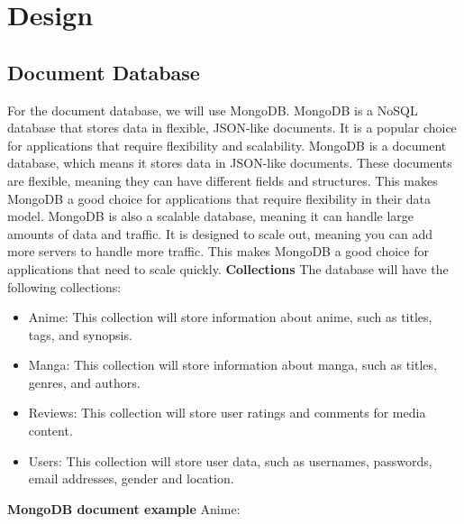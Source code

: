 \chapter{Design}


\section{Document Database}
For the document database, we will use MongoDB. MongoDB is a NoSQL database that stores data in flexible, JSON-like documents. It is a popular choice for applications that require flexibility and scalability. MongoDB is a document database, which means it stores data in JSON-like documents. These documents are flexible, meaning they can have different fields and structures. This makes MongoDB a good choice for applications that require flexibility in their data model. MongoDB is also a scalable database, meaning it can handle large amounts of data and traffic. It is designed to scale out, meaning you can add more servers to handle more traffic. This makes MongoDB a good choice for applications that need to scale quickly.
\newline
\newline
\textbf{Collections}
The database will have the following collections:
\begin{itemize}
    \item Anime: This collection will store information about anime, such as titles, tags, and synopsis.
    \item Manga: This collection will store information about manga, such as titles, genres, and authors.
    \item Reviews: This collection will store user ratings and comments for media content.
    \item Users: This collection will store user data, such as usernames, passwords, email addresses, gender and location.

\end{itemize}
\newpage
\textbf{MongoDB document example}
\newline
Anime:
